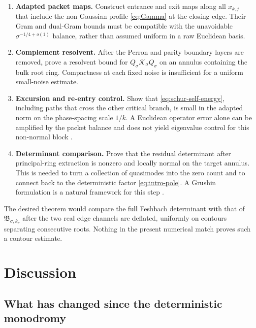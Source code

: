 \documentclass[11pt]{article}
\theoremstyle{definition}
\theoremstyle{remark}
\newcommand{\cK}{\mathcal K}
\begin{document}
\begin{enumerate}[label=\textbf{F\arabic*.},leftmargin=3.1em]
 \item \textbf{Adapted packet maps.}
 Construct entrance and exit maps along all $x_{k,j}$ that include the
 non-Gaussian profile \eqref{eq:Gamma} at the closing edge.  Their Gram and
 dual-Gram bounds must be compatible with the unavoidable
 $\sigma^{-1/4+o(1)}$ balance, rather than assumed uniform in a raw Euclidean
 basis.

 \item \textbf{Complement resolvent.}
 After the Perron and parity boundary layers are removed, prove a resolvent
 bound for $Q_\sigma\cK_\sigma Q_\sigma$ on an annulus containing the bulk
 root ring.  Compactness at each fixed noise is insufficient for a uniform
 small-noise estimate.

 \item \textbf{Excursion and re-entry control.}
 Show that \eqref{eq:schur-self-energy}, including paths that cross the other
 critical branch, is small in the adapted norm on the phase-spacing scale
 $1/k$.  A Euclidean operator error alone can be amplified by the packet
 balance and does not yield eigenvalue control for this non-normal block
 \citep{Kato1995,TrefethenEmbree2005}.

 \item \textbf{Determinant comparison.}
 Prove that the residual determinant after principal-ring extraction is
 nonzero and locally normal on the target annulus.  This is needed to turn a
 collection of quasimodes into the zero count and to connect back to the
 deterministic factor \eqref{eq:intro-pole}.  A Grushin formulation is a
 natural framework for this step \citep{SjoestrandZworski2007}.
\end{enumerate}

The desired theorem would compare the full Feshbach determinant with that of
$\mathfrak B_{\sigma,k_\sigma}$ after the two real edge channels are
deflated, uniformly on contours separating consecutive roots.  Nothing in
the present numerical match proves such a contour estimate.

\section{Discussion}
\label{sec:discussion}

\subsection{What has changed since the deterministic monodromy}
\end{document}
